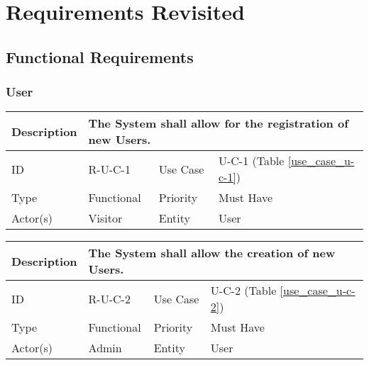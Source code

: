\chapter{Requirements Revisited}
\label{appendix:requirements_revisited}

\section{Functional Requirements}


\subsection{User}

\begin{tabular}{|p{1.5cm}|p{1.5cm}|p{1.5cm}|p{1.5cm}|p{1.5cm}|p{1.5cm}|p{1.5cm}|p{1.5cm}|p{1.5cm}|p{1.5cm}|p{1.5cm}|p{1.5cm}|}
    \hline
    \multicolumn{2}{|o|}{Description} & \multicolumn{10}{p{12.5cm}|}{The System shall allow for the registration of new Users.} \\ \hline
    \multicolumn{2}{|o|}{ID}          & \multicolumn{4}{n}{R-U-C-1}            & \multicolumn{2}{|o|}{Use Case}    & \multicolumn{4}{n|}{U-C-1 (Table \ref{use_case_u-c-1})} \\ \hline
    \multicolumn{2}{|o|}{Type}        & \multicolumn{4}{n}{Functional}         & \multicolumn{2}{|o|}{Priority}    & \multicolumn{4}{n|}{Must Have}  \\ \hline
    \multicolumn{2}{|o|}{Actor(s)}    & \multicolumn{4}{n}{Visitor}            & \multicolumn{2}{|o|}{Entity}      & \multicolumn{4}{n|}{User} \\ \hline
\end{tabular}

\begin{tabular}{|p{1.5cm}|p{1.5cm}|p{1.5cm}|p{1.5cm}|p{1.5cm}|p{1.5cm}|p{1.5cm}|p{1.5cm}|p{1.5cm}|p{1.5cm}|p{1.5cm}|p{1.5cm}|}
    \hline
    \multicolumn{2}{|o|}{Description} & \multicolumn{10}{p{12.5cm}|}{The System shall allow the creation of new Users.} \\ \hline
    \multicolumn{2}{|o|}{ID}          & \multicolumn{4}{n}{R-U-C-2}            & \multicolumn{2}{|o|}{Use Case}    & \multicolumn{4}{n|}{U-C-2 (Table \ref{use_case_u-c-2})} \\ \hline
    \multicolumn{2}{|o|}{Type}        & \multicolumn{4}{n}{Functional}         & \multicolumn{2}{|o|}{Priority}    & \multicolumn{4}{n|}{Must Have}  \\ \hline
    \multicolumn{2}{|o|}{Actor(s)}    & \multicolumn{4}{n}{Admin}              & \multicolumn{2}{|o|}{Entity}      & \multicolumn{4}{n|}{User} \\ \hline
\end{tabular}

